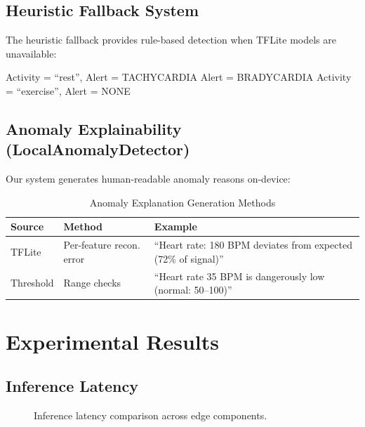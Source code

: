 \documentclass[conference]{IEEEtran}
\begin{document}
\subsection{Heuristic Fallback System}
The heuristic fallback provides rule-based detection when TFLite models are unavailable:

\begin{algorithmic}
    \STATE Activity = ``rest'', Alert = TACHYCARDIA
    \STATE Alert = BRADYCARDIA
    \STATE Activity = ``exercise'', Alert = NONE
\ENDIF
\end{algorithmic}

\subsection{Anomaly Explainability (LocalAnomalyDetector)}
Our system generates human-readable anomaly reasons on-device:

\begin{table}[H]
\centering
\caption{Anomaly Explanation Generation Methods}
\label{tab:explanations}
\begin{tabular}{p{1.5cm}p{2cm}p{3.5cm}}
\toprule
\textbf{Source} & \textbf{Method} & \textbf{Example} \\
\midrule
TFLite & Per-feature recon. error & ``Heart rate: 180 BPM deviates from expected (72\% of signal)'' \\
\midrule
Threshold & Range checks & ``Heart rate 35 BPM is dangerously low (normal: 50--100)'' \\
\bottomrule
\end{tabular}
\end{table}

\section{Experimental Results}

\subsection{Inference Latency}

\begin{figure}[H]
\centering
{}
\caption{Inference latency comparison across edge components.}
\label{fig:inference_latency}
\end{figure}
\end{document}
